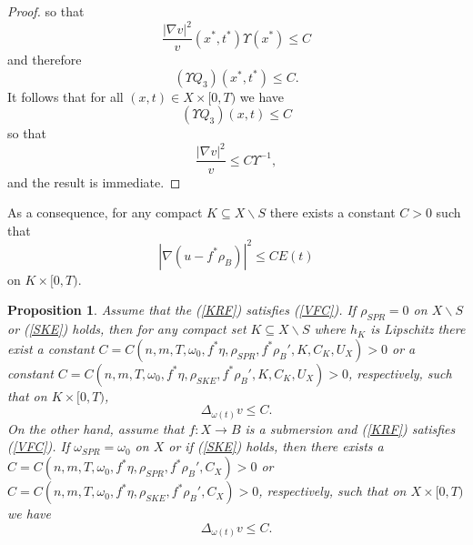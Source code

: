 \documentclass[12pt]{article}
\newtheorem{proposition}[theorem]{Proposition}
\numberwithin{equation}{section}
\begin{document}
\begin{proof}
so that
\begin{equation*}
    \frac{|\nabla v|^2}{v}(x^*,t^*) \Upsilon(x^*) \leq C
\end{equation*}
and therefore 
\begin{equation*}
    (\Upsilon Q_3)(x^*,t^*) \leq C.
\end{equation*}
It follows that for all $(x,t) \in X \times [0,T)$ we have
\begin{equation*}
    (\Upsilon Q_3)(x,t) \leq C
\end{equation*}
so that
\begin{equation*}
    \frac{|\nabla v|^2}{v} \leq C\Upsilon^{-1},
\end{equation*}
and the result is immediate.
\end{proof}

\noindent As a consequence, for any compact $K \subseteq X \backslash S$ there exists a constant $C > 0$ such that 
\begin{equation*}
    |\nabla (u-f^*\rho_B)|^2 \leq CE(t)
\end{equation*}
on $K \times [0,T)$.


\begin{proposition}
Assume that the (\ref{KRF}) satisfies (\ref{VFC}). If $\rho_{SPR} = 0$ on $X \backslash S$ or (\ref{SKE}) holds, then for any compact set $K \subseteq X \backslash S$ where $h_K$ is Lipschitz there exist a constant $C = C(n,m,T,\omega_0,f^*\eta,\rho_{SPR},f^*\rho_B',K,C_K,U_X) > 0$ or a constant $C = C(n,m,T,\omega_0,f^*\eta,\rho_{SKE},f^*\rho_B',K,C_K,U_X) > 0$, respectively, such that on $K \times [0,T)$,
\begin{equation*}
    \Delta_{\omega(t)} v \leq C.
\end{equation*}
On the other hand, assume that $f:X \to B$ is a submersion and (\ref{KRF}) satisfies (\ref{VFC}). If $\omega_{SPR} = \omega_{0}$ on $X$ or if (\ref{SKE}) holds, then there exists a $C = C(n,m,T,\omega_0, f^*\eta,\rho_{SPR},f^*\rho_B',C_X) > 0$ or $C = C(n,m,T,\omega_0,f^*\eta,\rho_{SKE},f^*\rho_B',C_X) > 0$, respectively, such that on $X \times [0,T)$ we have
\begin{equation*}
    \Delta_{\omega(t)} v \leq C.
\end{equation*}
\end{proposition}
\end{document}
